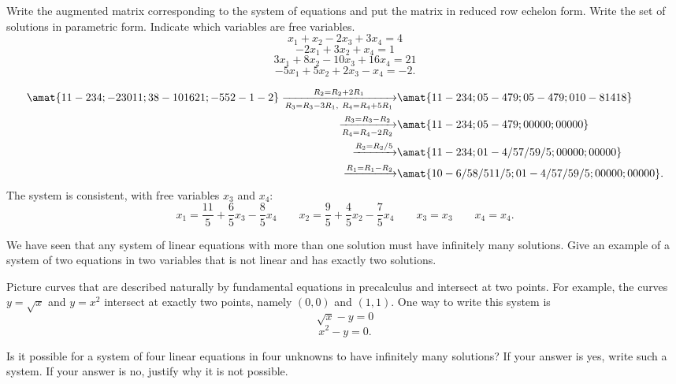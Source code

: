 \begin{problems}
\problem %
Write the augmented matrix corresponding to the system of
equations and put the matrix in reduced row echelon form.  Write the
set of solutions in parametric form.  Indicate which variables are
free variables.
\[x_1 + x_2 - 2x_3 + 3x_4 = 4\]
\[-2x_1 + 3x_2 + x_4 = 1\]
\[3x_1 + 8x_2 - 10x_3 + 16x_4 = 21\]
\[-5x_1 + 5x_2 + 2x_3 - x_4 = -2.\]
\begin{solution}
  \begin{align*}
    \amat{1 1 -2 3 4; -2 3 0 1 1; 3 8 -10 16 21; -5 5 2 -1 -2}
    \xrightarrow[R_3 = R_3 -3R_1, \ R_4 = R_4 + 5R_1]{R_2 = R_2 + 2R_1}
    &
      \amat{1 1 -2 3 4; 0 5 -4 7 9; 0 5 -4 7 9; 0 10 -8 14 18}
    \\
    \xrightarrow[R_4 = R_4 - 2R_2]{R_3 = R_3 - R_2}
    &                                                  
      \amat{1 1 -2 3 4; 0 5 -4 7 9; 0 0 0 0 0; 0 0 0 0 0}
    \\
    \xrightarrow[]{R_2 = R_2/5}
    &
      \amat{1 1 -2 3 4; 0 1 -4/5 7/5 9/5; 0 0 0 0 0; 0 0 0 0 0}
    \\
    \xrightarrow[]{R_1 = R_1 - R_2}
    &
      \amat{1 0 -6/5 8/5 11/5; 0 1 -4/5 7/5 9/5; 0 0 0 0 0; 0 0 0 0 0}.
  \end{align*}
  The system is consistent, with free variables $x_3$ and $x_4$:
  \[x_1 = \dfrac{11}{5} + \dfrac{6}{5} x_3 - \dfrac{8}{5} x_4
    \qquad
    x_2 = \dfrac{9}{5} + \dfrac{4}{5} x_2 - \dfrac{7}{5} x_4
    \qquad
    x_3 = x_3
    \qquad
    x_4 = x_4.
    \]
\end{solution}

\problem We have seen that any system of linear equations with more
than one solution must have infinitely many solutions.  Give an
example of a system of two equations in two variables that is not
linear and has exactly two solutions.

\begin{solution}
  Picture curves that are described naturally by fundamental equations
  in precalculus and intersect at two points.  For example, the curves
  $y = \sqrt{x}$ and $y=x^2$ intersect at exactly two points, namely
  $(0, 0)$ and $(1,1)$.  One way to write this system is
	\[\sqrt{x} - y = 0\]
	\[x^2 - y = 0.\]	
\end{solution}

\problem Is it possible for a system of four linear equations in four
unknowns to have infinitely many solutions?  If your answer is yes,
write such a system.  If your answer is no, justify why it is not
possible.
	

\end{problems}
